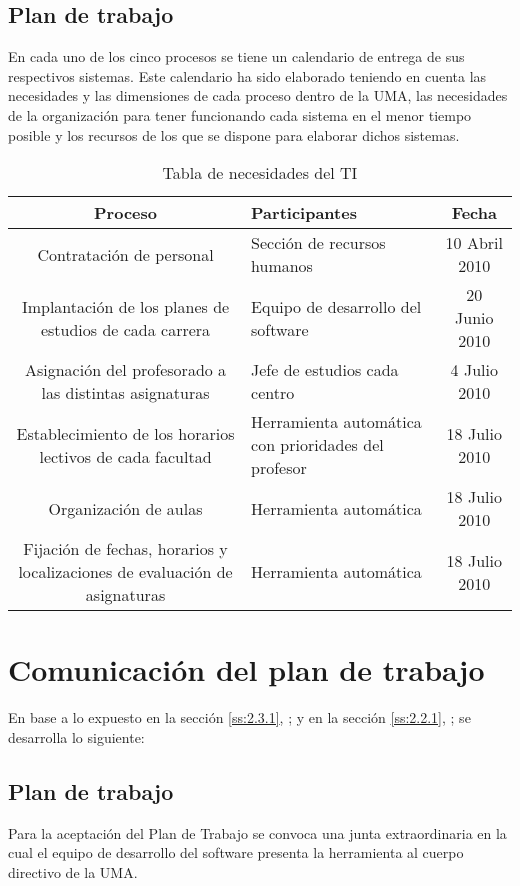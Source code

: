 \documentclass[11pt,a4paper,spanish,twoside]{book}
\begin{document}
\subsection{Plan de trabajo} \label{ss:2.3.1}
En cada uno de los cinco procesos se tiene un calendario de entrega de sus
respectivos sistemas. Este calendario ha sido elaborado teniendo en cuenta
las necesidades y las dimensiones de cada proceso dentro de la UMA, las
necesidades de la organización para tener funcionando cada sistema en el menor
tiempo posible y los recursos de los que se dispone para elaborar dichos
sistemas. 

\begin{table}[!h]
\centering
  \begin{tabular}{clc}
    \textbf{Proceso} & \textbf{Participantes} & \textbf{Fecha} \\ \hline 
    \hline \hline
    Contratación de personal & Sección de recursos humanos & 10 Abril 2010\\
    Implantación de los planes de estudios de cada carrera & Equipo de
    desarrollo del software & 20 Junio 2010\\
    Asignación del profesorado a las distintas asignaturas & Jefe de estudios
    cada centro  & 4 Julio 2010\\
    Establecimiento de los horarios lectivos de cada facultad & Herramienta
    automática con prioridades del profesor & 18 Julio 2010\\
    Organización de aulas & Herramienta automática & 18 Julio 2010\\
    Fijación de fechas, horarios y localizaciones de evaluación de
    asignaturas & Herramienta automática & 18 Julio 2010\\
  \end{tabular}
\caption{Tabla de necesidades del TI}
\end{table}

\section{Comunicación del plan de trabajo}
En base a lo expuesto en la sección \vref{ss:2.3.1},
\emph{}; y en la sección \vref{ss:2.2.1},
\emph{}; se desarrolla lo siguiente:

\subsection{Plan de trabajo}
Para la aceptación del Plan de Trabajo se convoca una junta extraordinaria en
la cual el equipo de desarrollo del software presenta la herramienta al
cuerpo directivo de la UMA.
\end{document}
